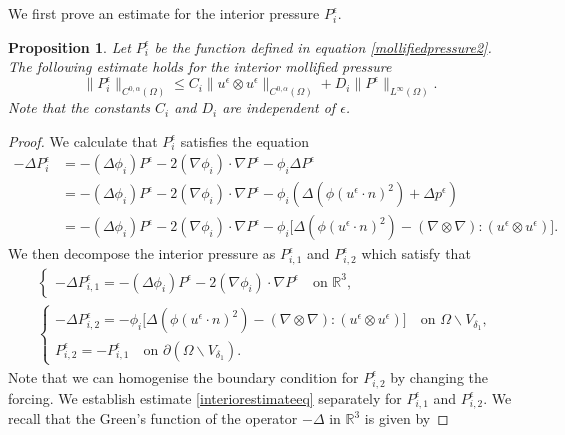 \documentclass[12pt,a4paper]{article}
\newtheorem{proposition}[theorem]{Proposition}
\theoremstyle{definition}
\theoremstyle{remark}
\numberwithin{equation}{section}
\begin{document}
We first prove an estimate for the interior pressure $P^\epsilon_i$. 
\begin{proposition} \label{interiorestimate}
Let $P^\epsilon_i$ be the function defined in equation \eqref{mollifiedpressure2}. The following estimate holds for the interior mollified pressure
\begin{equation} \label{interiorestimateeq}
\lVert P^\epsilon_i \rVert_{C^{0, \alpha} (\Omega)} \leq C_i \lVert u^\epsilon \otimes u^\epsilon \rVert_{C^{0, \alpha} (\Omega)} + D_i \lVert P^\epsilon \rVert_{L^\infty (\Omega)}.
\end{equation}
Note that the constants $C_i$ and $D_i$ are independent of $\epsilon$.
\end{proposition}
\begin{proof}
We calculate that $P^\epsilon_i$ satisfies the equation
\begin{align*}
-\Delta P^\epsilon_i &= - (\Delta \phi_i) P^\epsilon - 2  (\nabla \phi_i) \cdot \nabla P^\epsilon - \phi_i \Delta P^\epsilon \\
&= - (\Delta \phi_i) P^\epsilon - 2  (\nabla \phi_i) \cdot \nabla P^\epsilon - \phi_i (\Delta (\phi (u^\epsilon \cdot n)^2) + \Delta p^\epsilon) \\
&= - (\Delta \phi_i) P^\epsilon - 2  (\nabla \phi_i) \cdot \nabla P^\epsilon - \phi_i \big[ \Delta (\phi (u^\epsilon \cdot n)^2) - (\nabla \otimes \nabla) : (u^\epsilon \otimes u^\epsilon) \big].
\end{align*}
We then decompose the interior pressure as $P^\epsilon_{i,1}$ and $P^\epsilon_{i,2}$ which satisfy that
\begin{align*}
&\begin{cases} -\Delta P^\epsilon_{i,1} = - (\Delta \phi_i) P^\epsilon - 2  (\nabla \phi_i) \cdot \nabla P^\epsilon \quad \text{on } \mathbb{R}^3 , 
\end{cases} \\
&\begin{cases}
-\Delta P^\epsilon_{i,2} = - \phi_i \big[ \Delta (\phi (u^\epsilon \cdot n)^2) - (\nabla \otimes \nabla) : (u^\epsilon \otimes u^\epsilon) \big] \quad \text{on } \Omega \backslash V_{\delta_1},  \\
P^\epsilon_{i,2} = - P^\epsilon_{i,1} \quad \text{on } \partial (\Omega \backslash V_{\delta_1}).
\end{cases}
\end{align*}
Note that we can homogenise the boundary condition for $P^\epsilon_{i,2}$ by changing the forcing. We establish estimate \eqref{interiorestimateeq} separately for $P^\epsilon_{i,1}$ and $P^\epsilon_{i,2}$. We recall that the Green's function of the operator $-\Delta$ in $\mathbb{R}^3$ is given by

\end{proof}
\end{document}
